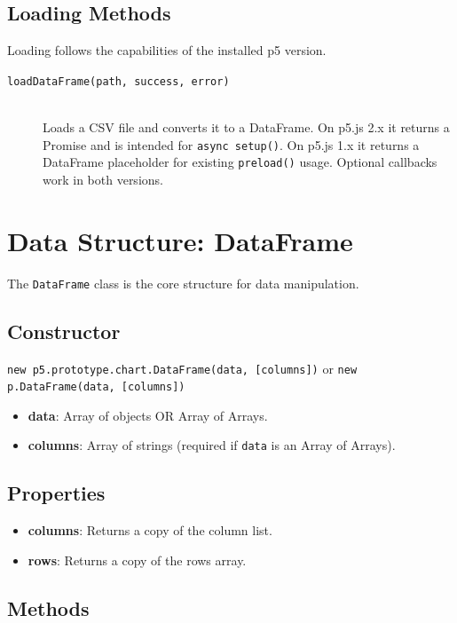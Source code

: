 \documentclass[10pt, a4paper]{article}
\begin{document}
\subsection{Loading Methods}
Loading follows the capabilities of the installed p5 version.

\begin{description}
    \item[\texttt{loadDataFrame(path, success, error)}] \hfill \\
    Loads a CSV file and converts it to a DataFrame. On p5.js 2.x it returns a Promise and is intended for \texttt{async setup()}. On p5.js 1.x it returns a DataFrame placeholder for existing \texttt{preload()} usage. Optional callbacks work in both versions.
\end{description}

\section{Data Structure: DataFrame}

The \texttt{DataFrame} class is the core structure for data manipulation.

\subsection{Constructor}
\texttt{new p5.prototype.chart.DataFrame(data, [columns])} or \texttt{new p.DataFrame(data, [columns])}
\begin{itemize}
    \item \textbf{data}: Array of objects OR Array of Arrays.
    \item \textbf{columns}: Array of strings (required if \texttt{data} is an Array of Arrays).
\end{itemize}

\subsection{Properties}
\begin{itemize}
    \item \textbf{columns}: Returns a copy of the column list.
    \item \textbf{rows}: Returns a copy of the rows array.
\end{itemize}

\subsection{Methods}
\end{document}
